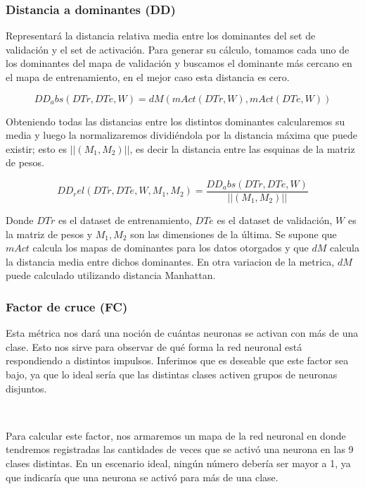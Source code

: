 \documentclass[informe.tex]{subfiles}
\begin{document}
      \subsubsection{Distancia a dominantes (DD)}
      
      Representar\'a la distancia relativa media entre los dominantes del set de validaci\'on y el set de activaci\'on. Para generar su cálculo, tomamos cada uno de los dominantes del mapa de validación y buscamos el dominante más cercano en el mapa de entrenamiento, en el mejor caso esta distancia es cero. 
      
      $$DD_abs(DTr, DTe, W) = dM(mAct(DTr,W), mAct(DTe,W))$$
      
      Obteniendo todas las distancias entre los distintos dominantes calcularemos su media y luego la normalizaremos dividiéndola por la distancia máxima que puede existir; esto es $||(M_1,M_2)||$, es decir la distancia entre las esquinas de la matriz de pesos.
      
      $$DD_rel(DTr, DTe, W, M_1, M_2) = \frac{DD_abs(DTr, DTe, W)}{||(M_1,M_2)||}$$
      
      Donde $DTr$ es el dataset de entrenamiento, $DTe$ es el dataset de validación, $W$ es la matriz de pesos y $M_1, M_2$  son las dimensiones de la última. Se supone que $mAct$ calcula los mapas de dominantes para los datos otorgados y que $dM$ calcula la distancia media entre dichos dominantes. En otra variacion de la metrica, $dM$ puede calculado utilizando distancia Manhattan.
      
      \subsubsection{Factor de cruce (FC)}
      
      Esta métrica nos dará una noción de cuántas neuronas se activan con más de una clase. Esto nos sirve para observar de qué forma la red neuronal está respondiendo a distintos impulsos. Inferimos que es deseable que este factor sea bajo, ya que lo ideal sería que las distintas clases activen grupos de neuronas disjuntos.
      
      ~
      
      Para calcular este factor, nos armaremos un mapa de la red neuronal en donde tendremos registradas las cantidades de veces que se activó una neurona en las 9 clases distintas. En un escenario ideal, ningún número debería ser mayor a 1, ya que indicaría que una neurona se activó para más de una clase.
      
\end{document}
